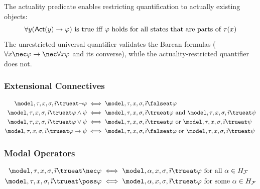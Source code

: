 \documentclass[../LogosReference.tex]{subfiles}
\begin{document}
\begin{remark}
	The actuality predicate enables restricting quantification to actually existing objects:
	\[
		\forall y(\mathsf{Act}(y) \to \varphi) \text{ is true iff } \varphi \text{ holds for all states that are parts of } \tau(x)
	\]
	The unrestricted universal quantifier validates the Barcan formulas ($\forall x \nec\metaA \to \nec\forall x\metaA$ and its converse), while the actuality-restricted quantifier does not.
\end{remark}

\subsubsection{Extensional Connectives}

\begin{definition}\label{def:extensional-truth}
	\begin{align}
		\model, \history, x, \assignment, \tempindex \trueat \neg\metaA          & \iff \model, \history, x, \assignment, \tempindex \falseat \metaA                                                                         \\
		\model, \history, x, \assignment, \tempindex \trueat \metaA \land \metaB & \iff \model, \history, x, \assignment, \tempindex \trueat \metaA \text{ and } \model, \history, x, \assignment, \tempindex \trueat \metaB \\
		\model, \history, x, \assignment, \tempindex \trueat \metaA \lor \metaB  & \iff \model, \history, x, \assignment, \tempindex \trueat \metaA \text{ or } \model, \history, x, \assignment, \tempindex \trueat \metaB  \\
		\model, \history, x, \assignment, \tempindex \trueat \metaA \to \metaB   & \iff \model, \history, x, \assignment, \tempindex \falseat \metaA \text{ or } \model, \history, x, \assignment, \tempindex \trueat \metaB
	\end{align}
\end{definition}

\subsubsection{Modal Operators}

\begin{definition}\label{def:modal-truth}
	\begin{align}
		\model, \history, x, \assignment, \tempindex \trueat \nec\metaA  & \iff \model, \alpha, x, \assignment, \tempindex \trueat \metaA \text{ for all } \alpha \in \historyspace  \\
		\model, \history, x, \assignment, \tempindex \trueat \poss\metaA & \iff \model, \alpha, x, \assignment, \tempindex \trueat \metaA \text{ for some } \alpha \in \historyspace
	\end{align}
\end{definition}
\end{document}
